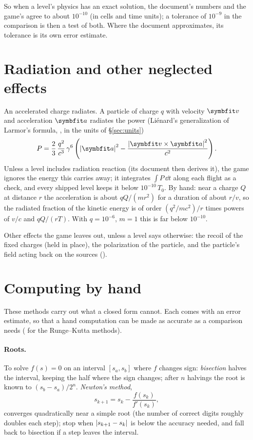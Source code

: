 \documentclass{leveldoc}
\begin{document}
So when a level's physics has an exact solution, the document's numbers and the game's agree
to about $10^{-10}$ (in cells and time units); a tolerance of $10^{-9}$ in the comparison is
then a test of both. Where the document approximates, its tolerance is its own error
estimate.

\section{Radiation and other neglected effects}\label{sec:radiation}

An accelerated charge radiates. A particle of charge $q$ with velocity $\vect{v}$ and
acceleration $\vect{a}$ radiates the power (Liénard's generalization of Larmor's formula,
, in the units of §\ref{sec:units})
\begin{equation}\label{eq:larmor}
  P = \frac{2}{3}\,\frac{q^2}{c^3}\,\gamma^6\left(\abs{\vect{a}}^2 - \frac{\abs{\vect{v}\times\vect{a}}^2}{c^2}\right).
\end{equation}
Unless a level includes radiation reaction (its document then derives it), the game ignores
the energy this carries away; it integrates $\int P\,\dd t$ along each flight as a check, and
every shipped level keeps it below $10^{-10}\,T_0$. By hand: near a charge $Q$ at distance $r$
the acceleration is about $qQ/(m r^2)$ for a duration of about $r/v$, so the radiated
fraction of the kinetic energy is of order $(q^2/mc^2)/r$ times powers of $v/c$ and $qQ/(rT)$.
With $q = 10^{-6}$, $m = 1$ this is far below $10^{-10}$.

Other effects the game leaves out, unless a level says otherwise: the recoil of the fixed
charges (held in place), the polarization of the particle, and the particle's field acting
back on the sources ().

\section{Computing by hand}\label{sec:numerics}

These methods carry out what a closed form cannot. Each comes with an error estimate, so that
a hand computation can be made as accurate as a comparison needs
( for the Runge--Kutta methods).

\paragraph{Roots.} To solve $f(s) = 0$ on an interval $[s_a, s_b]$ where $f$ changes sign:
\emph{bisection} halves the interval, keeping the half where the sign changes; after $n$
halvings the root is known to $(s_b-s_a)/2^n$. \emph{Newton's method},
\begin{equation}\label{eq:newton}
  s_{k+1} = s_k - \frac{f(s_k)}{f'(s_k)},
\end{equation}
converges quadratically near a simple root (the number of correct digits roughly doubles each
step); stop when $\left\lvert s_{k+1}-s_k\right\rvert$ is below the accuracy needed, and fall back to bisection
if a step leaves the interval.
\end{document}
